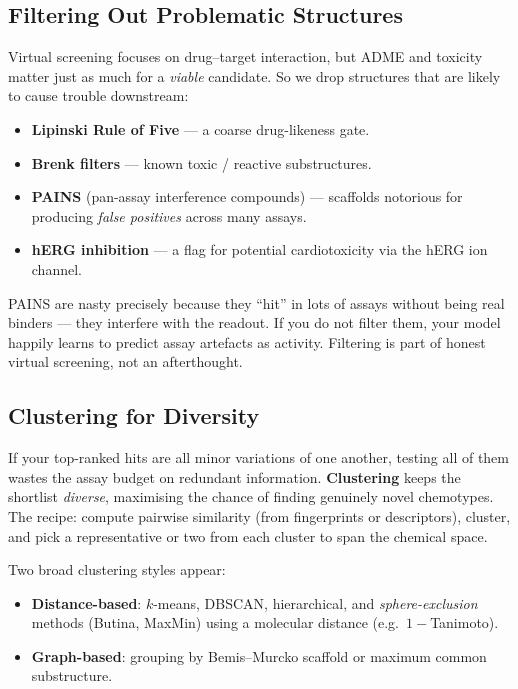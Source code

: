 \documentclass[11pt, oneside]{book}
\begin{document}
\subsection{Filtering Out Problematic Structures}

Virtual screening focuses on drug--target interaction, but ADME and toxicity
matter just as much for a \emph{viable} candidate. So we drop structures that are
likely to cause trouble downstream:

\begin{itemize}
  \item \textbf{Lipinski Rule of Five} --- a coarse drug-likeness gate.
  \item \textbf{Brenk filters} --- known toxic / reactive substructures.
  \item \textbf{PAINS} (pan-assay interference compounds) --- scaffolds notorious
        for producing \emph{false positives} across many assays.
  \item \textbf{hERG inhibition} --- a flag for potential cardiotoxicity via the
        hERG ion channel.
\end{itemize}

\begin{notebox}[title={PAINS: the false-positive trap}]
PAINS are nasty precisely because they ``hit'' in lots of assays without being
real binders --- they interfere with the readout. If you do not filter them, your
model happily learns to predict assay artefacts as activity. Filtering is part of
honest virtual screening, not an afterthought.
\end{notebox}

\subsection{Clustering for Diversity}

If your top-ranked hits are all minor variations of one another, testing all of
them wastes the assay budget on redundant information. \textbf{Clustering} keeps
the shortlist \emph{diverse}, maximising the chance of finding genuinely novel
chemotypes. The recipe: compute pairwise similarity (from fingerprints or
descriptors), cluster, and pick a representative or two from each cluster to span
the chemical space.

Two broad clustering styles appear:

\begin{itemize}
  \item \textbf{Distance-based}: $k$-means, DBSCAN, hierarchical, and
        \emph{sphere-exclusion} methods (Butina, MaxMin) using a molecular distance
        (e.g.\ $1-$Tanimoto).
  \item \textbf{Graph-based}: grouping by Bemis--Murcko scaffold or maximum common
        substructure.
\end{itemize}
\end{document}
